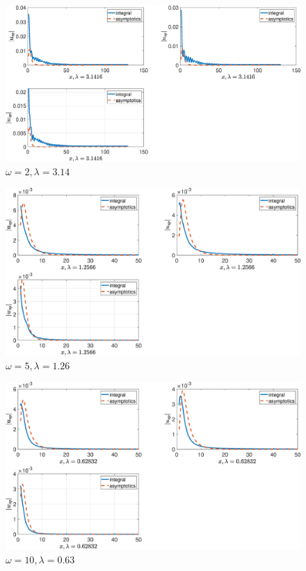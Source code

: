 \begin{figure}[!h]\centering\includegraphics[scale=0.38]{uspw2cp(1)1cp(2)2cs(1)0,3cs(20,5rho(1)1rho(2)2.eps}\caption{$ \omega = 2, \lambda=3.14$}\end{figure}

\begin{figure}[!h]\centering\includegraphics[scale=0.38]{uspw5cp(1)1cp(2)2cs(1)0,3cs(20,5rho(1)1rho(2)2.eps}\caption{$ \omega = 5, \lambda=1.26$}\end{figure}

\begin{figure}[!h]\centering\includegraphics[scale=0.38]{uspw10cp(1)1cp(2)2cs(1)0,3cs(20,5rho(1)1rho(2)2.eps}\caption{$ \omega = 10, \lambda=0.63$}\end{figure}

